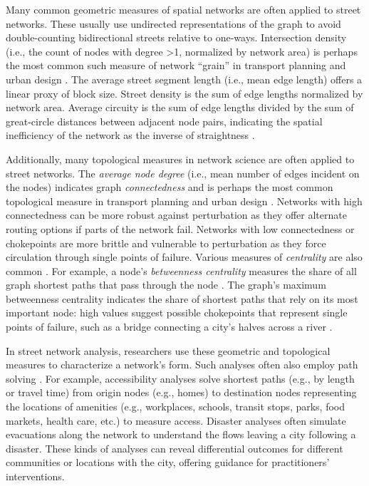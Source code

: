 \documentclass[12pt,letterpaper]{article} %
\begin{document}
Many common geometric measures of spatial networks are often applied to street networks. These usually use undirected representations of the graph to avoid double-counting bidirectional streets relative to one-ways. Intersection density (i.e., the count of nodes with degree >1, normalized by network area) is perhaps the most common such measure of network \enquote{grain} in transport planning and urban design \citep[e.g.,][]{ewing_travel_2010}. The average street segment length (i.e., mean edge length) offers a linear proxy of block size. Street density is the sum of edge lengths normalized by network area. Average circuity is the sum of edge lengths divided by the sum of great-circle distances between adjacent node pairs, indicating the spatial inefficiency of the network as the inverse of straightness \citep{boeing_urban_2019}.

Additionally, many topological measures in network science are often applied to street networks. The \textit{average node degree} (i.e., mean number of edges incident on the nodes) indicates graph \textit{connectedness} and is perhaps the most common topological measure in transport planning and urban design \citep{barrington-leigh_century_2015,barrington-leigh_more_2017,barrington-leigh_global_2020}. Networks with high connectedness can be more robust against perturbation as they offer alternate routing options if parts of the network fail. Networks with low connectedness or chokepoints are more brittle and vulnerable to perturbation as they force circulation through single points of failure. Various measures of \textit{centrality} are also common \citep{crucitti_centrality_2006}. For example, a node's \textit{betweenness centrality} measures the share of all graph shortest paths that pass through the node \citep{barthelemy_betweenness_2004,barthelemy_self-organization_2013}. The graph's maximum betweenness centrality indicates the share of shortest paths that rely on its most important node: high values suggest possible chokepoints that represent single points of failure, such as a bridge connecting a city's halves across a river \citep{boeing_multi-scale_2020}.

In street network analysis, researchers use these geometric and topological measures to characterize a network's form. Such analyses often also employ path solving \citep{miller_measuring_1999,wang_road_2020,liu_generalized_2021}. For example, accessibility analyses solve shortest paths (e.g., by length or travel time) from origin nodes (e.g., homes) to destination nodes representing the locations of amenities (e.g., workplaces, schools, transit stops, parks, food markets, health care, etc.) to measure access. Disaster analyses often simulate evacuations along the network to understand the flows leaving a city following a disaster. These kinds of analyses can reveal differential outcomes for different communities or locations with the city, offering guidance for practitioners' interventions.
\end{document}

